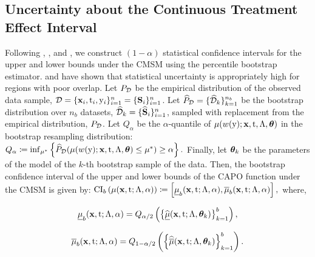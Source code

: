 \subsection{Uncertainty about the Continuous Treatment Effect Interval}
\label{sec:uncertainty}
Following \cite{zhao2019sensitivity}, \cite{dorn2021sharp}, and \cite{chernozhukov2021omitted}, we construct $(1 - \alpha)$ statistical confidence intervals for the upper and lower bounds under the CMSM using the percentile bootstrap estimator.
\cite{jesson2020identifying} and \cite{jesson2021quantifying} have shown that statistical uncertainty is  appropriately high for regions with poor overlap.
Let $P_{\mathcal{D}}$ be the empirical distribution of the observed data sample, $\mathcal{D}=\{\mathbf{x}_i, \mathrm{t}_i, \mathrm{y}_i\}_{i=1}^n = \{\mathbf{S}_i\}_{i=1}^n$.
Let $\widehat{P}_{\mathcal{D}} = \{\widehat{\mathcal{D}}_k\}_{k=1}^{n_b}$ be the bootstrap distribution over $n_b$ datasets, $\widehat{\mathcal{D}}_k=\{\widehat{\mathbf{S}}_i\}_{i=1}^n$, sampled with replacement from the empirical distribution, $P_{\mathcal{D}}$.
Let $Q_{\alpha}$ be the $\alpha$-quantile of $\mu(w(\mathrm{y}); \mathbf{x}, \mathrm{t}, \Lambda, \bm{\theta})$ in the bootstrap resampling distribution: 
$
Q_{\alpha} \coloneqq \inf_{\mu^*} \left\{\widehat{P}_{\mathcal{D}}(\mu(w(\mathrm{y}); \mathbf{x}, \mathrm{t}, \Lambda, \bm{\theta}) \leq \mu^*) \geq \alpha \right\}.
$
Finally, let $\bm{\theta}_k$ be the parameters of the model of the $k$-th bootstrap sample of the data.
Then, the bootstrap confidence interval of the upper and lower bounds of the CAPO function under the CMSM is given by:
$
    \mathrm{CI}_b\left(\mu(\mathbf{x}, \mathrm{t}; \Lambda, \alpha) \right) \coloneqq \left[ \underline{\mu}_{b}(\mathbf{x}, \mathrm{t}; \Lambda, \alpha), \overline{\mu}_{b}(\mathbf{x}, \mathrm{t}; \Lambda, \alpha) \right],
$
where,
\noindent
\begin{minipage}{.50\linewidth}
    \begin{equation*}
        \underline{\mu}_{b}(\mathbf{x}, \mathrm{t}; \Lambda, \alpha) = Q_{\alpha / 2} \left( \left\{ \widehat{\underline{\mu}}(\mathbf{x}, \mathrm{t}; \Lambda, \bm{\theta}_k)  \right\}_{k = 1}^b \right),
    \end{equation*}
\end{minipage}%
\begin{minipage}{.50\linewidth}
    \begin{equation*}
        \overline{\mu}_{b}(\mathbf{x}, \mathrm{t}; \Lambda, \alpha) =  Q_{1 - \alpha / 2} \left( \left\{ \widehat{\overline{\mu}}(\mathbf{x}, \mathrm{t}; \Lambda, \bm{\theta}_k)  \right\}_{k = 1}^b \right).
    \end{equation*}
\end{minipage}

